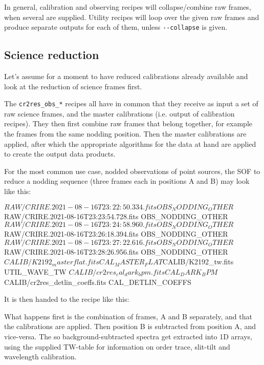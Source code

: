 In general, calibration and observing recipes will collapse/combine raw frames,
when several are supplied. Utility recipes will loop over the given raw frames
and produce separate outputs for each of them, unless \verb!--collapse! is
given.



\subsection{Science reduction}
\label{sec:sci-reduc}
Let's assume for a moment to have reduced calibrations already available
and look at the reduction of science frames first.

The \texttt{cr2res\_obs\_*} recipes all have in common that they receive as
input a set of raw science frames, and the master calibrations (i.e. output of
calibration recipes). They then first combine raw frames that belong together,
for example the frames from the same nodding position. Then the master
calibrations are applied, after which the appropriate algorithms for the data at
hand are applied to create the output data products.

For the most common use case, nodded observations of point sources,
the SOF to reduce a nodding sequence (three frames  each in positions A and B)
may look like this:
\begin{shell}[fontsize=\small]
$RAW/CRIRE.2021-08-16T23:22:50.334.fits OBS_NODDING_OTHER
$RAW/CRIRE.2021-08-16T23:23:54.728.fits OBS_NODDING_OTHER
$RAW/CRIRE.2021-08-16T23:24:58.960.fits OBS_NODDING_OTHER
$RAW/CRIRE.2021-08-16T23:26:18.394.fits OBS_NODDING_OTHER
$RAW/CRIRE.2021-08-16T23:27:22.616.fits OBS_NODDING_OTHER
$RAW/CRIRE.2021-08-16T23:28:26.956.fits OBS_NODDING_OTHER
$CALIB/K2192_masterflat.fits           CAL_MASTER_FLAT
$CALIB/K2192_tw.fits                   UTIL_WAVE_TW
$CALIB/cr2res_cal_dark_bpm.fits        CAL_DARK_BPM
$CALIB/cr2res_detlin_coeffs.fits       CAL_DETLIN_COEFFS
\end{shell}

It is then handed to the recipe like this:
\begin{shell}[fontsize=\small]
\end{shell}

What happens first is the combination of frames, A and B separately, and that
the calibrations are applied. Then position B is subtracted from position A, and
vice-versa. The so background-subtracted spectra get extracted into 1D arrays,
using the supplied TW-table for information on order trace, slit-tilt and
wavelength calibration.

